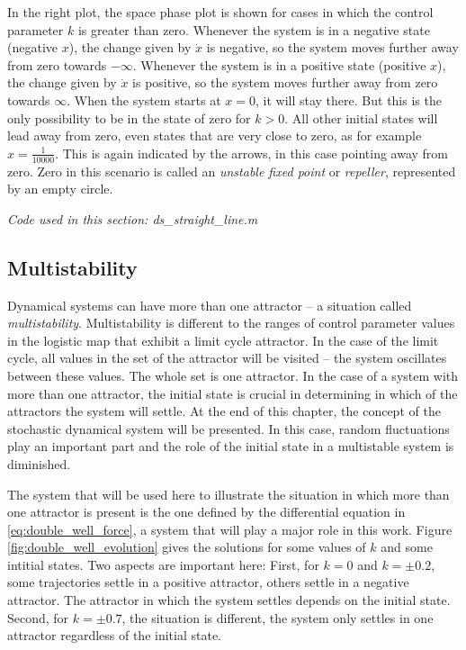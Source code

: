 In the right plot, the space phase plot is shown for cases in which the control parameter $k$ is greater than zero. Whenever the system is in a negative state (negative $x$), the change given by $\dot{x}$ is negative, so the system moves further away from zero towards $-\infty$. Whenever the system is in a positive state (positive $x$), the change given by $\dot{x}$ is positive, so the system moves further away from zero towards $\infty$. When the system starts at $x = 0$, it will stay there. But this is the only possibility to be in the state of zero for $k > 0$. All other initial states will lead away from zero, even states that are very close to zero, as for example $x = \frac{1}{10000}$. This is again indicated by the arrows, in this case pointing away from zero. Zero in this scenario is called an \emph{unstable fixed point} or \emph{repeller}, represented by an empty circle.

\medskip\noindent \textit{Code used in this section: ds\_straight\_line.m}

\subsection{Multistability}

Dynamical systems can have more than one attractor -- a situation called \emph{multistability}. Multistability is different to the ranges of control parameter values in the logistic map that exhibit a limit cycle attractor. In the case of the limit cycle, all values in the set of the attractor will be visited – the system oscillates between these values. The whole set is one attractor. In the case of a system with more than one attractor, the initial state is crucial in determining in which of the attractors the system will settle. At the end of this chapter, the concept of the stochastic dynamical system will be presented. In this case, random fluctuations play an important part and the role of the initial state in a multistable system is diminished.

The system that will be used here to illustrate the situation in which more than one attractor is present is the one defined by the differential equation in \ref{eq:double_well_force}, a system that will play a major role in this work. Figure \ref{fig:double_well_evolution} gives the solutions for some values of $k$ and some intitial states. Two aspects are important here: First, for $k = 0$ and $k = \pm0.2$, some trajectories settle in a positive attractor, others settle in a negative attractor. The attractor in which the system settles depends on the initial state. Second, for $k = \pm0.7$, the situation is different, the system only settles in one attractor regardless of the initial state.

